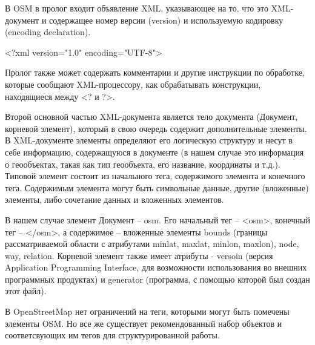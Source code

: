 \documentclass[12pt,a4paper,oneside]{article} %
\begin{document}
В OSM в пролог входит объявление XML, указывающее на то, что это XML-документ и содержащее номер версии (version) и используемую кодировку (encoding declaration).

<?xml version="1.0" encoding="UTF-8">

Пролог также может содержать комментарии и другие инструкции по обработке, которые сообщают XML-процессору, как обрабатывать конструкции, находящиеся между <? и ?>.

Второй основной частью XML-документа является тело документа (Документ, корневой элемент), который в свою очередь содержит дополнительные элементы. В XML-документе элементы определяют его логическую структуру и несут в себе информацию, содержащуюся в документе (в нашем случае это информация о геообъектах, такая как тип геообъекта, его название, координаты и т.д.). Типовой элемент состоит из начального тега, содержимого элемента и конечного тега. Содержимым элемента могут быть символьные данные, другие (вложенные) элементы, либо сочетание данных и вложенных элементов.

В нашем случае элемент Документ – osm. Его начальный тег – <osm>, конечный тег – </osm>, а содержимое – вложенные элементы bounds (границы рассматриваемой области с атрибутами minlat, maxlat, minlon, maxlon), node, way, relation. Корневой элемент также имеет атрибуты - versoin (версия Application Programming Interface, для возможности использования во внешних программных продуктах) и generator (программа, с помощью которой был создан этот файл).

В OpenStreetMap нет ограничений на теги, которыми могут быть помечены элементы OSM. Но все же существует рекомендованный набор объектов и соответсвующих им тегов для структурированной работы.
\end{document}
